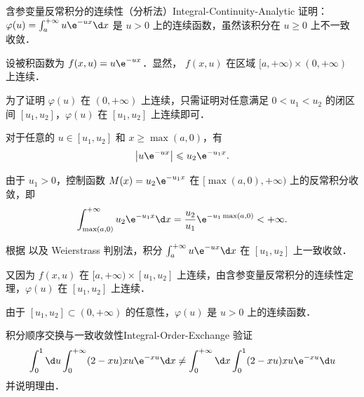 \begin{problem}{含参变量反常积分的连续性（分析法）}{Integral-Continuity-Analytic}
    证明：$\varphi(u) = \int_a^{+\infty} u\e^{-ux} \d x$ 是 $u > 0$ 上的连续函数，虽然该积分在 $u \geqslant 0$ 上不一致收敛．
\end{problem}

\begin{myproof}
    设被积函数为 $f(x, u) = u\e^{-ux}$．显然， $f(x, u)$ 在区域 $[a, +\infty) \times (0, +\infty)$ 上连续．

    为了证明 $\varphi(u)$ 在 $(0, +\infty)$ 上连续，只需证明对任意满足 $0 < u_1 < u_2$ 的闭区间 $[u_1, u_2]$，$\varphi(u)$ 在 $[u_1, u_2]$ 上连续即可．

    对于任意的 $u \in [u_1, u_2]$ 和 $x \geqslant \max(a, 0)$，有
    \begin{equation}\label{eq:bound-f}
        \left| u\e^{-ux} \right| \leqslant u_2 \e^{-u_1 x}.
    \end{equation}

    由于 $u_1 > 0$，控制函数 $M(x) = u_2 \e^{-u_1 x}$ 在 $[\max(a, 0), +\infty)$ 上的反常积分收敛，即
    \begin{equation}\label{eq:control-int}
        \int_{\max(a, 0)}^{+\infty} u_2 \e^{-u_1 x} \d x = \frac{u_2}{u_1} \e^{-u_1 \max(a, 0)} < +\infty.
    \end{equation}

    根据  以及 Weierstrass 判别法，积分 $\int_a^{+\infty} u\e^{-ux} \d x$ 在 $[u_1, u_2]$ 上一致收敛．

    又因为 $f(x,u)$ 在 $[a, +\infty) \times [u_1, u_2]$ 上连续，由含参变量反常积分的连续性定理，$\varphi(u)$ 在 $[u_1, u_2]$ 上连续．

    由于 $[u_1, u_2] \subset (0, +\infty)$ 的任意性，$\varphi(u)$ 是 $u > 0$ 上的连续函数．
\end{myproof}

\begin{problem}{积分顺序交换与一致收敛性}{Integral-Order-Exchange}
    验证
    \begin{equation}\label{eq:verify-eq}
        \int_0^1 \d u \int_0^{+\infty} (2-xu)xu\e^{-xu} \d x \neq \int_0^{+\infty} \d x \int_0^1 (2-xu)xu\e^{-xu} \d u
    \end{equation}
    并说明理由．
\end{problem}

